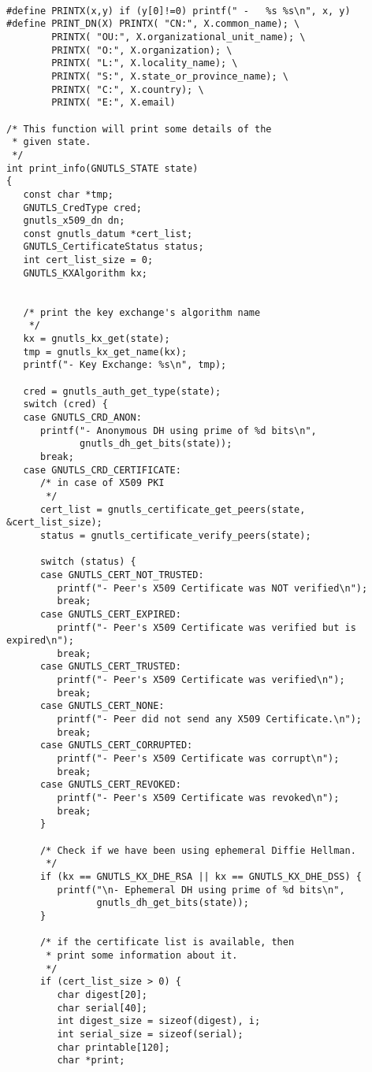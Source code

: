 \begin{verbatim}

#define PRINTX(x,y) if (y[0]!=0) printf(" -   %s %s\n", x, y)
#define PRINT_DN(X) PRINTX( "CN:", X.common_name); \
        PRINTX( "OU:", X.organizational_unit_name); \
        PRINTX( "O:", X.organization); \
        PRINTX( "L:", X.locality_name); \
        PRINTX( "S:", X.state_or_province_name); \
        PRINTX( "C:", X.country); \
        PRINTX( "E:", X.email)

/* This function will print some details of the
 * given state.
 */
int print_info(GNUTLS_STATE state)
{
   const char *tmp;
   GNUTLS_CredType cred;
   gnutls_x509_dn dn;
   const gnutls_datum *cert_list;
   GNUTLS_CertificateStatus status;
   int cert_list_size = 0;
   GNUTLS_KXAlgorithm kx;


   /* print the key exchange's algorithm name
    */
   kx = gnutls_kx_get(state);
   tmp = gnutls_kx_get_name(kx);
   printf("- Key Exchange: %s\n", tmp);

   cred = gnutls_auth_get_type(state);
   switch (cred) {
   case GNUTLS_CRD_ANON:
      printf("- Anonymous DH using prime of %d bits\n",
             gnutls_dh_get_bits(state));
      break;
   case GNUTLS_CRD_CERTIFICATE:
      /* in case of X509 PKI
       */
      cert_list = gnutls_certificate_get_peers(state, &cert_list_size);
      status = gnutls_certificate_verify_peers(state);

      switch (status) {
      case GNUTLS_CERT_NOT_TRUSTED:
         printf("- Peer's X509 Certificate was NOT verified\n");
         break;
      case GNUTLS_CERT_EXPIRED:
         printf("- Peer's X509 Certificate was verified but is expired\n");
         break;
      case GNUTLS_CERT_TRUSTED:
         printf("- Peer's X509 Certificate was verified\n");
         break;
      case GNUTLS_CERT_NONE:
         printf("- Peer did not send any X509 Certificate.\n");
         break;
      case GNUTLS_CERT_CORRUPTED:
         printf("- Peer's X509 Certificate was corrupt\n");
         break;
      case GNUTLS_CERT_REVOKED:
         printf("- Peer's X509 Certificate was revoked\n");
         break;
      }

      /* Check if we have been using ephemeral Diffie Hellman.
       */
      if (kx == GNUTLS_KX_DHE_RSA || kx == GNUTLS_KX_DHE_DSS) {
         printf("\n- Ephemeral DH using prime of %d bits\n",
                gnutls_dh_get_bits(state));
      }

      /* if the certificate list is available, then
       * print some information about it.
       */
      if (cert_list_size > 0) {
         char digest[20];
         char serial[40];
         int digest_size = sizeof(digest), i;
         int serial_size = sizeof(serial);
         char printable[120];
         char *print;


\end{verbatim}
